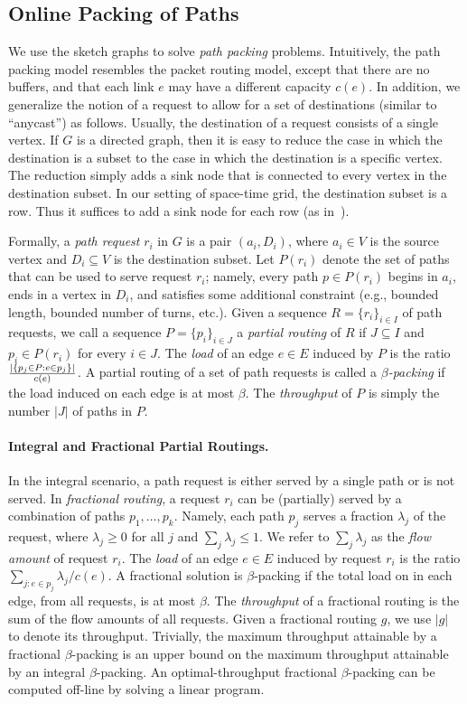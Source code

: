 \documentclass[11pt]{article}
\newenvironment{proof sketch}[1]{\noindent {\emph{Proof sketch of #1:}}}{\hfill \qed}
\begin{document}
\subsection{Online Packing of Paths}\label{sec:IPP}
We use  the sketch graphs to solve \emph{path packing} problems.
Intuitively, the path packing model resembles the packet routing
model, except that there are no buffers, and that each link $e$ may
have a different capacity $c(e)$.
In addition,  we
generalize the notion of a request to allow for a set of destinations
(similar to ``anycast'') as follows. Usually, the destination of a request consists of a
single vertex. If $G$ is a directed graph, then it is easy to reduce
the case in which the destination is a subset to the case in which
the destination is a specific vertex. The reduction simply adds a
sink node that is connected to every vertex in the destination
subset. In our setting of space-time grid, the destination subset is
a row. Thus it suffices to add a sink node for each row (as in~\cite{AZ}).

Formally, a \emph{path request} $r_i$ in $G$ is a pair $(a_i, D_i)$, where $a_i\in V$
is the source vertex and $D_i\subseteq V$ is the destination subset.  Let $P(r_i)$
denote the set of paths that can be used to serve request $r_i$; namely, every path
$p\in P(r_i)$ begins in $a_i$, ends in a vertex in $D_i$, and satisfies some
additional constraint (e.g., bounded length, bounded number of turns, etc.).  Given a sequence $R=\{r_i\}_{i\in I}$
of path requests, we call a sequence $P=\{p_i\}_{i \in J}$ a \emph{partial routing}
of $R$ if $J\subseteq I$ and $p_i\in P(r_i)$ for every $i\in J$.  The \emph{load} of
an edge $e\in E$ induced by $P$ is the ratio $|\{p_j \in P: e\in p_j\}|\over
c(e)$. A partial routing of a set of path requests is called a \emph{$\beta$-packing} if the
load induced on each edge is at most $\beta$.  The \emph{throughput} of $P$ is simply
the number $|J|$ of paths in $P$.

\paragraph{Integral and Fractional Partial Routings\ifnum{}.\fi}
In the integral scenario,
a path request is either  served by a single path or is not served.
In \emph{fractional routing},
a request $r_i$ can be (partially) served by a combination of paths
$p_1,\ldots,p_k$. Namely, each path $p_j$ serves a fraction
$\lambda_j$ of the request, where $\lambda_j\ge 0$ for all
$j$ and  $\sum_j \lambda_{j}\le1$. We refer to $\sum_j \lambda_{j}$ as the \emph{flow
amount} of request $r_i$. The \emph{load} of an edge $e\in
E$ induced by request $r_i$ is the ratio $\sum_{j: e\in
p_j} \lambda_{j} / c(e)$. A fractional solution is
$\beta$-packing if the total load on in each edge, from all
requests, is at most $\beta$.   The \emph{throughput} of a
fractional routing is the sum of the flow amounts of all requests. Given a
fractional routing $g$, we use $|g|$ to denote its
throughput.
Trivially, the maximum throughput attainable
by a fractional $\beta$-packing is an upper bound on the maximum
throughput attainable by an integral $\beta$-packing.  An
optimal-throughput fractional $\beta$-packing can be computed off-line
by
solving a linear program.
\end{document}
